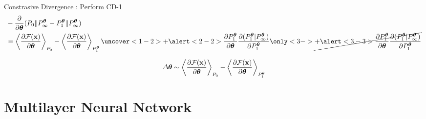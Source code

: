 	\begin{frame}[t]{Constrasive Divergence}
	:
	 Perform CD-1
	    \begin{align}
	    &-\dfrac{\partial}{\partial \btheta} (P_0\|P_{\infty}^{\btheta} - P_{1}^{\btheta}\|P_{\infty}^{\btheta})\nonumber\\\vspace{3mm}
	    &=\left\langle \frac{\partial \mathcal{F}(\x)}{\partial \boldsymbol{\theta}}\right\rangle_{P_0} 
		  -\left\langle \frac{\partial \mathcal{F}(\x)}{\partial \boldsymbol{\theta}}\right\rangle_{P_{1}^{\btheta}}\nonumber
		  \uncover<1-2>{+ \alert<2-2>{\frac{\partial P_{1}^{\btheta}}{\partial \btheta} \frac{\partial (P_{1}^{\btheta}|P_{\infty}^{\btheta})}{\partial P_{1}^{\btheta}}\nonumber}}
		  \only<3->{ \cancel{+\alert<3-3>{\frac{\partial P_{1}^{\btheta}}{\partial \btheta} \frac{\partial (P_{1}^{\btheta}|P_{\infty}^{\btheta})}{\partial P_{1}^{\btheta}}\nonumber}}}
	    \end{align}
	    
	 {
	 \begin{align}
	  \Delta \boldsymbol{\theta} \sim \left\langle \frac{\partial \mathcal{F}(\mathbf{x})}{\partial \boldsymbol{\theta}}\right\rangle_{P_0} 
		  -\left\langle \frac{\partial \mathcal{F}(\mathbf{x})}{\partial \boldsymbol{\theta}}\right\rangle_{P_{1}^{\boldsymbol{\theta}}}\nonumber
	 \end{align}
	}
	\end{frame}
% 
% 
% 
% 
% 
%   

\section{Multilayer Neural Network}%
